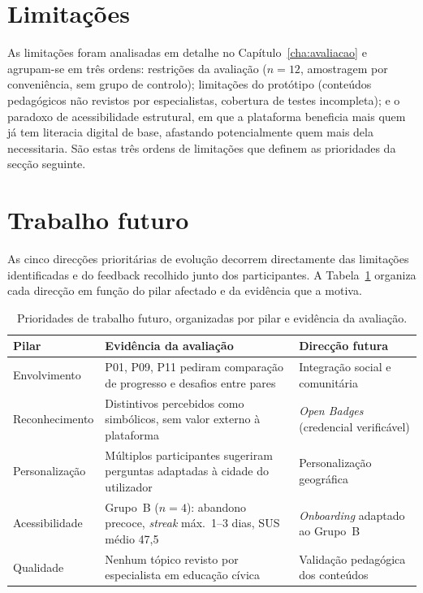 \section{Limitações}
\label{sec:limitacoes}

As limitações foram analisadas em detalhe no Capítulo~\ref{cha:avaliacao} e agrupam-se em três ordens: restrições da avaliação ($n=12$, amostragem por conveniência, sem grupo de controlo); limitações do protótipo (conteúdos pedagógicos não revistos por especialistas, cobertura de testes incompleta); e o paradoxo de acessibilidade estrutural, em que a plataforma beneficia mais quem já tem literacia digital de base, afastando potencialmente quem mais dela necessitaria. São estas três ordens de limitações que definem as prioridades da secção seguinte.

\section{Trabalho futuro}
\label{sec:trabalho-futuro}

As cinco direcções prioritárias de evolução decorrem directamente das limitações identificadas e do feedback recolhido junto dos participantes. A Tabela~\ref{tab:trabalho-futuro} organiza cada direcção em função do pilar afectado e da evidência que a motiva.

\begin{table}[ht]
\centering
\small
\begin{tabular}{p{2.8cm}p{5.0cm}p{4.8cm}}
\toprule
\textbf{Pilar} & \textbf{Evidência da avaliação} & \textbf{Direcção futura} \\
\midrule
Envolvimento     & P01, P09, P11 pediram comparação de progresso e desafios entre pares & Integração social e comunitária \\[2pt]
Reconhecimento   & Distintivos percebidos como simbólicos, sem valor externo à plataforma & \emph{Open Badges} (credencial verificável) \\[2pt]
Personalização   & Múltiplos participantes sugeriram perguntas adaptadas à cidade do utilizador & Personalização geográfica \\[2pt]
Acessibilidade   & Grupo~B ($n=4$): abandono precoce, \emph{streak} máx.\ 1--3 dias, SUS médio 47,5 & \emph{Onboarding} adaptado ao Grupo~B \\[2pt]
Qualidade        & Nenhum tópico revisto por especialista em educação cívica & Validação pedagógica dos conteúdos \\
\bottomrule
\end{tabular}
\caption{Prioridades de trabalho futuro, organizadas por pilar e evidência da avaliação.}
\label{tab:trabalho-futuro}
\end{table}

